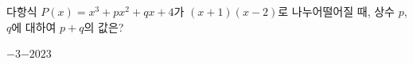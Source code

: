 다항식 $P(x)=x^3+px^2+qx+4$가 $(x+1)(x-2)$로 나누어떨어질 때, 상수 $p$, $q$에 대하여 $p+q$의 값은?
\begin{choices32}{$-3$}{$-2$}{$0$}{$2$}{$3$}\end{choices32}

